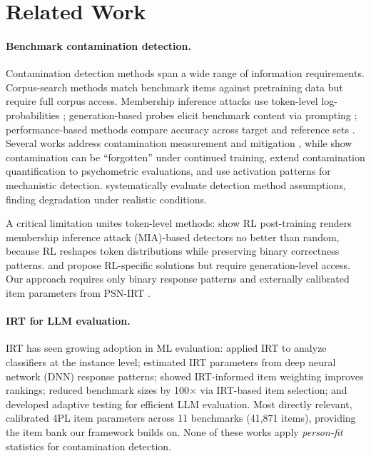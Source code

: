 \section{Related Work}\label{sec:related_work}

\paragraph{Benchmark contamination detection.}
Contamination detection methods span a wide range of information requirements.
Corpus-search methods match benchmark items against pretraining data \citep{dodge2021, magar2022} but require full corpus access.
Membership inference attacks use token-level log-probabilities \citep{minkprob2024, deng2024}; generation-based probes elicit benchmark content via prompting \citep{golchin2024, golchin2024quiz, oren2024}; performance-based methods compare accuracy across target and reference sets \citep{constat2024, pacost2024, codec2026}.
Several works address contamination measurement and mitigation \citep{zhou2023benchmark, sainz2023, jacovi2023}, while \citet{bordt2025forget} show contamination can be ``forgotten'' under continued training, \citet{han2026quantifying} extend contamination quantification to psychometric evaluations, and \citet{kattamuri2025radar} use activation patterns for mechanistic detection.
\citet{fu2025contamination} systematically evaluate detection method assumptions, finding degradation under realistic conditions.

A critical limitation unites token-level methods: \citet{wang2025fragility} show RL post-training renders membership inference attack (MIA)-based detectors no better than random, because RL reshapes token distributions while preserving binary correctness patterns.
\citet{selfcritique2026} and \citet{zhang2026rlvr} propose RL-specific solutions but require generation-level access.
Our approach requires only binary response patterns and externally calibrated item parameters from PSN-IRT \citep{psnirt2026}.

\paragraph{IRT for LLM evaluation.}
IRT has seen growing adoption in ML evaluation: \citet{martinezplumed2019} applied IRT to analyze classifiers at the instance level; \citet{lalor2019} estimated IRT parameters from deep neural network (DNN) response patterns; \citet{rodriguez2021} showed IRT-informed item weighting improves rankings; \citet{polo2024tinybenchmarks} reduced benchmark sizes by 100$\times$ via IRT-based item selection; and \citet{atlas2025} developed adaptive testing for efficient LLM evaluation.
Most directly relevant, \citet{psnirt2026} calibrated 4PL item parameters across 11 benchmarks (41,871 items), providing the item bank our framework builds on.
None of these works apply \emph{person-fit} statistics for contamination detection.

